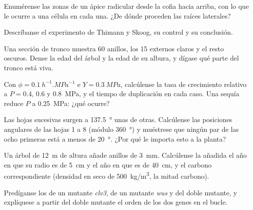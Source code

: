 \begin{exercise}[$\star$]\label{exo:b2:plant-meristems:2}
Enumérense las zonas de un ápice radicular desde la cofia hacia arriba,
con lo que le ocurre a una célula en cada una. ¿De dónde proceden las
raíces laterales?
\end{exercise}

\begin{exercise}[$\star$]\label{exo:b2:plant-meristems:3}
Descríbanse el experimento de Thimann y Skoog, su control y su conclusión.
\end{exercise}

\begin{exercise}[$\star$]\label{exo:b2:plant-meristems:4}
Una sección de tronco muestra 60 anillos, los 15 externos claros y el
resto oscuros. Dense la edad del árbol y la edad de su albura, y dígase
qué parte del tronco está viva.
\end{exercise}

\begin{exercise}[$\star\star$]\label{exo:b2:plant-meristems:5}
Con $\phi = \qty{0.1}{h^{-1}.MPa^{-1}}$ e $Y = \qty{0.3}{MPa}$, calcúlense
la tasa de crecimiento relativo a $P = 0.4$, $0.6$ y \qty{0.8}{MPa}, y el
tiempo de duplicación en cada caso. Una sequía reduce $P$ a
\qty{0.25}{MPa}: ¿qué ocurre?
\end{exercise}

\begin{exercise}[$\star\star$]\label{exo:b2:plant-meristems:6}
Las hojas sucesivas surgen a \qty{137.5}{\degree} unas de otras.
Calcúlense las posiciones angulares de las hojas 1 a 8 (módulo
\qty{360}{\degree}) y muéstrese que ningún par de las ocho primeras está a
menos de \qty{20}{\degree}. ¿Por qué le importa esto a la planta?
\end{exercise}

\begin{exercise}[$\star\star$]\label{exo:b2:plant-meristems:7}
Un árbol de \qty{12}{m} de altura añade anillos de \qty{3}{mm}. Calcúlense
la  añadida el año en que su radio es de \qty{5}{cm} y el año en que
es de \qty{40}{cm}, y el carbono correspondiente (densidad en seco de
\qty{500}{kg/m^3}, la mitad carbono).
\end{exercise}

\begin{exercise}[$\star\star$]\label{exo:b2:plant-meristems:8}
Predíganse los  de un mutante \emph{clv3}, de un mutante
\emph{wus} y del doble mutante, y explíquese a partir del doble mutante el
orden de los dos genes en el bucle.
\end{exercise}

